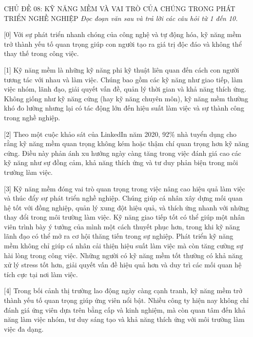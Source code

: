 \documentclass[12pt,a4paper,twoside]{article}
\newenvironment{readingpassage}[1][]{%
    \begin{tcolorbox}[enhanced, colback=grayLight, colframe=secondaryBlue,
        coltitle=textDark, fonttitle=\bfseries, title={#1},
        rounded corners, arc=3mm, boxrule=1pt,
        left=15pt, right=15pt, top=10pt, bottom=10pt,
        breakable, before skip=10pt, after skip=10pt, drop fuzzy shadow]
    \setstretch{1.3}
}{\end{tcolorbox}}
\begin{document}
\newpage
\label{a_cd08}
\begin{topicbox}{\large CHỦ ĐỀ 08: KỸ NĂNG MỀM VÀ VAI TRÒ CỦA CHÚNG TRONG PHÁT TRIỂN NGHỀ NGHIỆP}
\vspace{8pt}
\textit{Đọc đoạn văn sau và trả lời các câu hỏi từ 1 đến 10.}
\vspace{6pt}
\end{topicbox}
\vspace{5pt}
\begin{readingpassage}[]
[0] Với sự phát triển nhanh chóng của công nghệ và tự động hóa, kỹ năng mềm trở thành yếu tố quan trọng giúp con người tạo ra giá trị độc đáo và không thể thay thế trong công việc.

[1] Kỹ năng mềm là những kỹ năng phi kỹ thuật liên quan đến cách con người tương tác với nhau và làm việc. Chúng bao gồm các kỹ năng như giao tiếp, làm việc nhóm, lãnh đạo, giải quyết vấn đề, quản lý thời gian và khả năng thích ứng. Không giống như kỹ năng cứng (hay kỹ năng chuyên môn), kỹ năng mềm thường khó đo lường nhưng lại có tác động lớn đến hiệu suất làm việc và sự thành công trong nghề nghiệp.

[2] Theo một cuộc khảo sát của LinkedIn năm 2020, 92\% nhà tuyển dụng cho rằng kỹ năng mềm quan trọng không kém hoặc thậm chí quan trọng hơn kỹ năng cứng. Điều này phản ánh xu hướng ngày càng tăng trong việc đánh giá cao các kỹ năng như sự đồng cảm, khả năng thích ứng và tư duy phản biện trong môi trường làm việc.

[3] Kỹ năng mềm đóng vai trò quan trọng trong việc nâng cao hiệu quả làm việc và thúc đẩy sự phát triển nghề nghiệp. Chúng giúp cá nhân xây dựng mối quan hệ tốt với đồng nghiệp, quản lý xung đột hiệu quả, và thích ứng nhanh với những thay đổi trong môi trường làm việc. Kỹ năng giao tiếp tốt có thể giúp một nhân viên trình bày ý tưởng của mình một cách thuyết phục hơn, trong khi kỹ năng lãnh đạo có thể mở ra cơ hội thăng tiến trong sự nghiệp. Phát triển kỹ năng mềm không chỉ giúp cá nhân cải thiện hiệu suất làm việc mà còn tăng cường sự hài lòng trong công việc. Những người có kỹ năng mềm tốt thường có khả năng xử lý stress tốt hơn, giải quyết vấn đề hiệu quả hơn và duy trì các mối quan hệ tích cực tại nơi làm việc.

[4] Trong bối cảnh thị trường lao động ngày càng cạnh tranh, kỹ năng mềm trở thành yếu tố quan trọng giúp ứng viên nổi bật. Nhiều công ty hiện nay không chỉ đánh giá ứng viên dựa trên bằng cấp và kinh nghiệm, mà còn quan tâm đến khả năng làm việc nhóm, tư duy sáng tạo và khả năng thích ứng với môi trường làm việc đa dạng.


\end{readingpassage}
\end{document}
